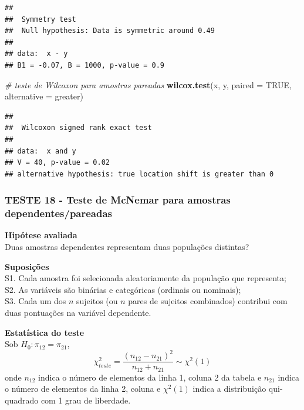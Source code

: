 \documentclass[
]{book}
\newenvironment{Shaded}{\begin{snugshade}}{\end{snugshade}}
\newcommand{\CommentTok}[1]{\textcolor[rgb]{0.56,0.35,0.01}{\textit{#1}}}
\newcommand{\DataTypeTok}[1]{\textcolor[rgb]{0.13,0.29,0.53}{#1}}
\newcommand{\KeywordTok}[1]{\textcolor[rgb]{0.13,0.29,0.53}{\textbf{#1}}}
\newcommand{\NormalTok}[1]{#1}
\newcommand{\OtherTok}[1]{\textcolor[rgb]{0.56,0.35,0.01}{#1}}
\newcommand{\StringTok}[1]{\textcolor[rgb]{0.31,0.60,0.02}{#1}}
\theoremstyle{definition}
\theoremstyle{definition}
\theoremstyle{definition}
\theoremstyle{remark}
\begin{document}
\begin{verbatim}
## 
##  Symmetry test
##  Null hypothesis: Data is symmetric around 0.49
## 
## data:  x - y
## B1 = -0.07, B = 1000, p-value = 0.9
\end{verbatim}

\begin{Shaded}
\begin{Highlighting}[]
\CommentTok{\# teste de Wilcoxon para amostras pareadas}
\KeywordTok{wilcox.test}\NormalTok{(x, y, }\DataTypeTok{paired =} \OtherTok{TRUE}\NormalTok{, }\DataTypeTok{alternative =} \StringTok{\textquotesingle{}greater\textquotesingle{}}\NormalTok{)}
\end{Highlighting}
\end{Shaded}

\begin{verbatim}
## 
##  Wilcoxon signed rank exact test
## 
## data:  x and y
## V = 40, p-value = 0.02
## alternative hypothesis: true location shift is greater than 0
\end{verbatim}

\hypertarget{teste-18---teste-de-mcnemar-para-amostras-dependentespareadas}{%
\subsubsection*{TESTE 18 - Teste de McNemar para amostras dependentes/pareadas}\label{teste-18---teste-de-mcnemar-para-amostras-dependentespareadas}}

\textbf{Hipótese avaliada}\\
Duas amostras dependentes representam duas populações distintas?

\textbf{Suposições}\\
S1. Cada amostra foi selecionada aleatoriamente da população que representa;\\
S2. As variáveis são binárias e categóricas (ordinais ou nominais);\\
S3. Cada um dos \(n\) sujeitos (ou \(n\) pares de sujeitos combinados) contribui com duas pontuações na variável dependente.

\textbf{Estatística do teste}\\
Sob \(H_0:\pi_{12}=\pi_{21}\),
\begin{equation} 
\chi_{teste}^2 = \frac{(n_{12}-n_{21})^2}{n_{12}+n_{21}} \sim \chi^2(1)
\label{eq:mcnemar}
\end{equation}
onde \(n_{12}\) indica o número de elementos da linha 1, coluna 2 da tabela e \(n_{21}\) indica o número de elementos da linha 2, coluna e \(\chi^2(1)\) indica a distribuição qui-quadrado com 1 grau de liberdade.
\end{document}
